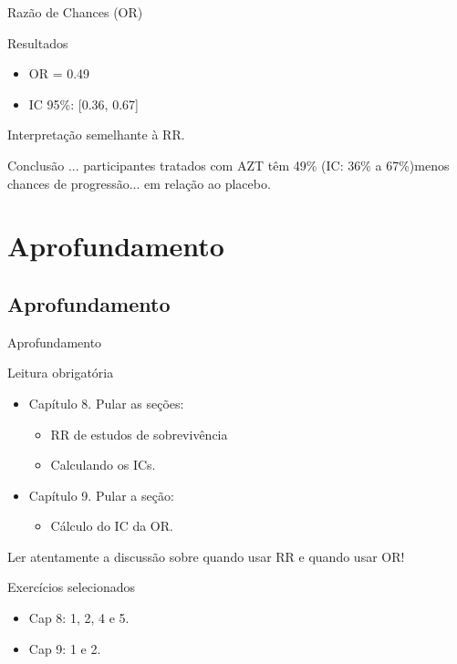 \documentclass{beamer}
\begin{document}
\begin{frame}{Razão de Chances (OR)}
  \begin{exampleblock}{Resultados}
    \begin{itemize}
      \footnotesize
    \item OR = 0.49
    \item IC 95\%: [0.36, 0.67]
    \end{itemize}
  \end{exampleblock}
  \begin{center}
    Interpretação semelhante à RR.
  \end{center}
  \begin{exampleblock}{Conclusão}
    ... participantes tratados com AZT têm 49\% (IC: 36\% a 67\%)menos chances de progressão... em relação ao placebo.
  \end{exampleblock}
\end{frame}

\section{Aprofundamento}

\subsection{Aprofundamento}

\begin{frame}{Aprofundamento}
  \footnotesize
  \begin{block}{Leitura obrigatória}
    \begin{itemize}
    \item Capítulo 8. Pular as seções:
      \begin{itemize}
        \scriptsize
      \item RR de estudos de sobrevivência
      \item Calculando os ICs.
      \end{itemize}
    \item Capítulo 9. Pular a seção:
      \begin{itemize}
        \scriptsize
      \item Cálculo do IC da OR.
      \end{itemize}
    \end{itemize}
    \begin{block}{}
      Ler \alert{atentamente} a discussão sobre quando usar RR e quando usar OR!
    \end{block}
  \end{block}
  \begin{block}{Exercícios selecionados}
    \begin{itemize}
    \item Cap 8: 1, 2, 4 e 5.
    \item Cap 9: 1 e 2.
    \end{itemize}
  \end{block}
\end{frame}
\end{document}
